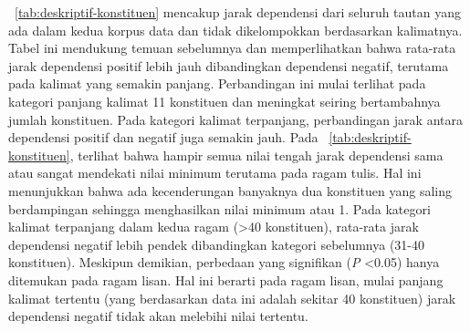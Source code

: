  \tab~\ref{tab:deskriptif-konstituen} mencakup jarak dependensi dari seluruh tautan yang ada dalam kedua korpus data dan tidak dikelompokkan berdasarkan kalimatnya. Tabel ini mendukung temuan sebelumnya dan memperlihatkan bahwa rata-rata jarak dependensi positif lebih jauh dibandingkan dependensi negatif, terutama pada kalimat yang semakin panjang. Perbandingan ini mulai terlihat pada kategori panjang kalimat 11 konstituen dan meningkat seiring bertambahnya jumlah konstituen. Pada kategori kalimat terpanjang, perbandingan jarak antara dependensi positif dan negatif juga semakin jauh. Pada \tab~\ref{tab:deskriptif-konstituen}, terlihat bahwa hampir semua nilai tengah jarak dependensi sama atau sangat mendekati nilai minimum terutama pada ragam tulis. Hal ini menunjukkan bahwa ada kecenderungan banyaknya dua konstituen yang saling berdampingan sehingga menghasilkan nilai minimum atau 1. Pada kategori kalimat terpanjang dalam kedua ragam (\textgreater 40 konstituen), rata-rata jarak dependensi negatif lebih pendek dibandingkan kategori sebelumnya (31-40 konstituen). Meskipun demikian, perbedaan yang signifikan (\textit{P} \textless 0.05) hanya ditemukan pada ragam lisan. Hal ini berarti pada ragam lisan, mulai panjang kalimat tertentu (yang berdasarkan data ini adalah sekitar 40 konstituen) jarak dependensi negatif tidak akan melebihi nilai tertentu. 

